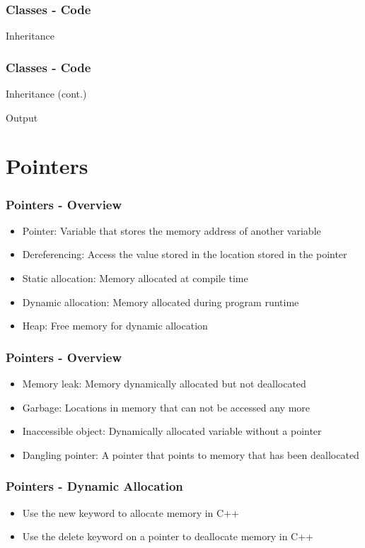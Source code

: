 \documentclass[c, aspectratio=169]{beamer}
\begin{document}
\begin{frame}\frametitle{Classes - Code}
Inheritance


\end{frame}

\begin{frame}[fragile]\frametitle{Classes - Code}
Inheritance (cont.)
\begin{center}

\end{center}

Output

\end{frame}

\section{Pointers}
\begin{frame}\frametitle{Pointers - Overview}
\begin{itemize}
\item Pointer: Variable that stores the memory address of another variable
\item Dereferencing: Access the value stored in the location stored in the pointer
\item Static allocation: Memory allocated at compile time
\item Dynamic allocation: Memory allocated during program runtime
\item Heap: Free memory for dynamic allocation
\end{itemize}
\end{frame}

\begin{frame}\frametitle{Pointers - Overview}
\begin{itemize}
\item Memory leak: Memory dynamically allocated but not deallocated
\item Garbage: Locations in memory that can not be accessed any more
\item Inaccessible object: Dynamically allocated variable without a pointer
\item Dangling pointer: A pointer that points to memory that has been deallocated
\end{itemize}
\end{frame}

\begin{frame}\frametitle{Pointers - Dynamic Allocation}
\begin{itemize}
\item Use the new keyword to allocate memory in C++
\item Use the delete keyword on a pointer to deallocate memory in C++
\end{itemize}
\end{frame}
\end{document}
